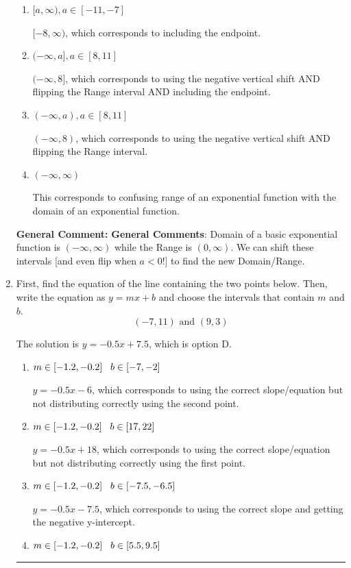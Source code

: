 \documentclass{extbook}[14pt]
\newcommand{\litem}[1]{\item #1

\rule{\textwidth}{0.4pt}}
\begin{document}
\begin{enumerate}
{\begin{enumerate}[label=\Alph*.]
* $(-8, \infty)$, which is the correct option.
\item \( [a, \infty), a \in [-11, -7] \)

$[-8, \infty)$, which corresponds to including the endpoint.
\item \( (-\infty, a], a \in [8, 11] \)

$(-\infty, 8]$, which corresponds to using the negative vertical shift AND flipping the Range interval AND including the endpoint.
\item \( (-\infty, a), a \in [8, 11] \)

$(-\infty, 8)$, which corresponds to using the negative vertical shift AND flipping the Range interval.
\item \( (-\infty, \infty) \)

This corresponds to confusing range of an exponential function with the domain of an exponential function.
\end{enumerate}

\textbf{General Comment:} \textbf{General Comments}: Domain of a basic exponential function is $(-\infty, \infty)$ while the Range is $(0, \infty)$. We can shift these intervals [and even flip when $a<0$!] to find the new Domain/Range.
}
\litem{
First, find the equation of the line containing the two points below. Then, write the equation as $ y=mx+b $ and choose the intervals that contain $m$ and $b$.
\[ (-7, 11) \text{ and } (9, 3) \]

The solution is \( y = -0.5x + 7.5 \), which is option D.\begin{enumerate}[label=\Alph*.]
\item \( m \in [-1.2, -0.2] \hspace*{3mm} b \in [-7, -2] \)

 $y = -0.5x -6$, which corresponds to using the correct slope/equation but not distributing correctly using the second point.
\item \( m \in [-1.2, -0.2] \hspace*{3mm} b \in [17, 22] \)

 $y = -0.5x + 18$, which corresponds to using the correct slope/equation but not distributing correctly using the first point.
\item \( m \in [-1.2, -0.2] \hspace*{3mm} b \in [-7.5, -6.5] \)

 $y = -0.5x -7.5$, which corresponds to using the correct slope and getting the negative y-intercept.
\item \( m \in [-1.2, -0.2] \hspace*{3mm} b \in [5.5, 9.5] \)


\end{enumerate}}
\end{enumerate}
\end{document}
